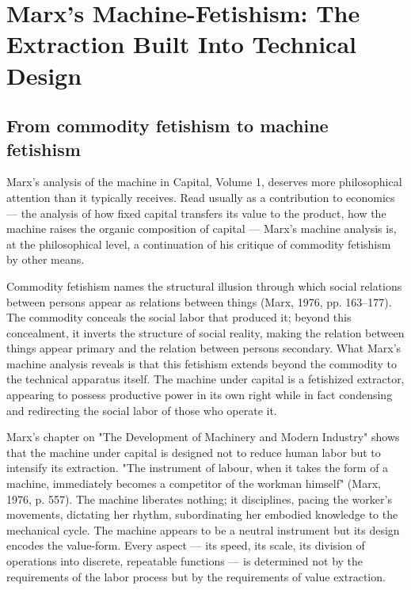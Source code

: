 \section{Marx's Machine-Fetishism: The Extraction Built Into Technical Design}

\subsection{From commodity fetishism to machine fetishism}

Marx's analysis of the machine in Capital, Volume 1, deserves more philosophical attention than it typically receives. Read usually as a contribution to economics — the analysis of how fixed capital transfers its value to the product, how the machine raises the organic composition of capital — Marx's machine analysis is, at the philosophical level, a continuation of his critique of commodity fetishism by other means.

Commodity fetishism names the structural illusion through which social relations between persons appear as relations between things (Marx, 1976, pp. 163–177). The commodity conceals the social labor that produced it; beyond this concealment, it inverts the structure of social reality, making the relation between things appear primary and the relation between persons secondary. What Marx's machine analysis reveals is that this fetishism extends beyond the commodity to the technical apparatus itself. The machine under capital is a fetishized extractor, appearing to possess productive power in its own right while in fact condensing and redirecting the social labor of those who operate it.

Marx's chapter on "The Development of Machinery and Modern Industry" shows that the machine under capital is designed not to reduce human labor but to intensify its extraction. "The instrument of labour, when it takes the form of a machine, immediately becomes a competitor of the workman himself" (Marx, 1976, p. 557). The machine liberates nothing; it disciplines, pacing the worker's movements, dictating her rhythm, subordinating her embodied knowledge to the mechanical cycle. The machine appears to be a neutral instrument but its design encodes the value-form. Every aspect — its speed, its scale, its division of operations into discrete, repeatable functions — is determined not by the requirements of the labor process but by the requirements of value extraction.


